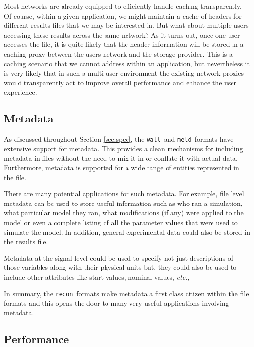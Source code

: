 \documentclass[11pt,a4paper,twocolumn]{article}
\newcommand{\recon}{\texttt{recon}}
\newcommand{\wall}{\texttt{wall}}
\newcommand{\meld}{\texttt{meld}}
\begin{document}
Most networks are already equipped to efficiently handle caching
transparently.  Of course, within a given application, we might
maintain a cache of headers for different results files that we may be
interested in.  But what about multiple users accessing these results
across the same network?  As it turns out, once one user accesses the
file, it is quite likely that the header information will be stored in
a caching proxy between the users network and the storage provider.
This is a caching scenario that we cannot address within an
application, but nevertheless it is very likely that in such a
multi-user environment the existing network proxies would
transparently act to improve overall performance and enhance the user
experience.

\subsection{Metadata}


As discussed throughout Section \ref{sec:spec}, the \wall\ and
\meld\ formats have extensive support for metadata.  This provides a
clean mechanisms for including metadata in files without the need to
mix it in or conflate it with actual data.  Furthermore, metadata is
supported for a wide range of entities represented in the file.

There are many potential applications for such metadata.  For example,
file level metadata can be used to store useful information such as
who ran a simulation, what particular model they ran, what
modifications (if any) were applied to the model or even a complete
listing of all the parameter values that were used to simulate the
model.  In addition, general experimental data could also be stored in
the results file.

Metadata at the signal level could be used to specify not just
descriptions of those variables along with their physical units but,
they could also be used to include other attributes like start values,
nominal values, \textit{etc.},

In summary, the \recon\ formats make metadata a first class citizen
within the file formats and this opens the door to many very useful
applications involving metadata.


\subsection{Performance}
\end{document}
